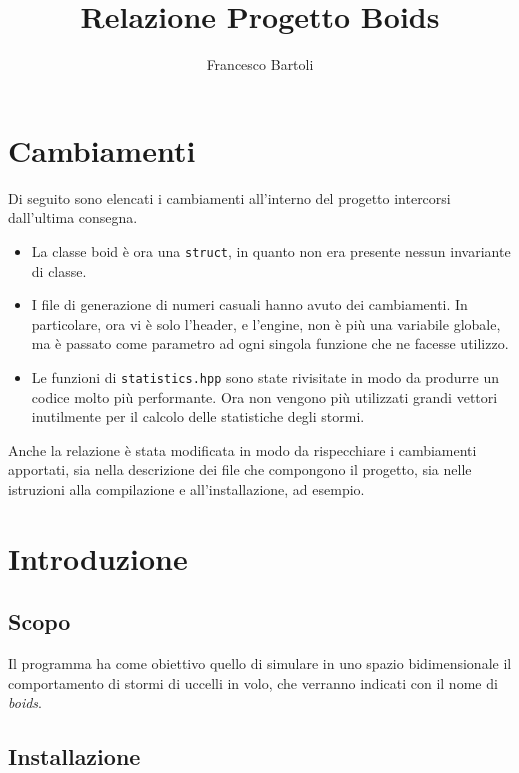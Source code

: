 \documentclass[10pt,a4paper]{article}
\title{Relazione Progetto Boids}
\author{Francesco Bartoli}
\date{}
\begin{document}
\maketitle

\hypertarget{toc}{}
\tableofcontents

\setlength{\parindent}{0pt}

\section*{Cambiamenti}

Di seguito sono elencati i cambiamenti all'interno del progetto intercorsi dall'ultima consegna.

\begin{itemize}
    \item La classe boid è ora una \texttt{struct}, in quanto non era presente nessun invariante di classe. 
    \item I file di generazione di numeri casuali hanno avuto dei cambiamenti. In particolare, ora vi è solo l'header, e l'engine, non è più una variabile globale, ma è passato come parametro ad ogni singola funzione che ne facesse utilizzo.
    \item Le funzioni di \texttt{statistics.hpp} sono state rivisitate in modo da produrre un codice molto più performante. Ora non vengono più utilizzati grandi vettori inutilmente per il calcolo delle statistiche degli stormi.
\end{itemize}

Anche la relazione è stata modificata in modo da rispecchiare i cambiamenti apportati, sia nella descrizione dei file che compongono il progetto, sia nelle istruzioni alla compilazione e all'installazione, ad esempio.

\newpage

\parskip 1.6pt
\section{Introduzione}
\subsection{Scopo}
Il programma ha come obiettivo quello di simulare in uno spazio bidimensionale il comportamento di stormi di uccelli in volo, che verranno indicati con il nome di \textit{boids}.

\subsection{Installazione}
\end{document}
